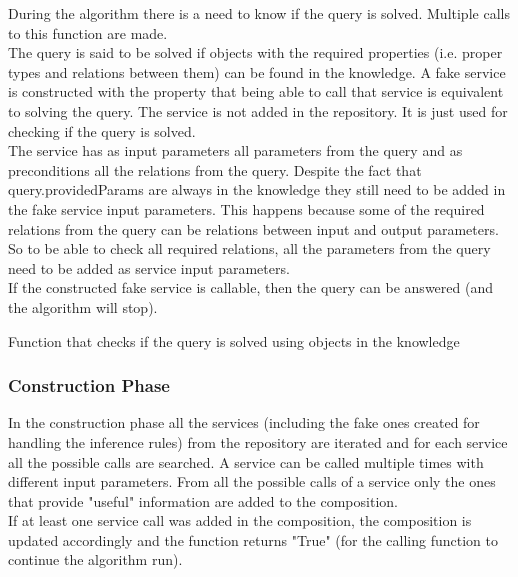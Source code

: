 \documentclass[12pt]{article}
\theoremstyle{definition}
\begin{document}
	During the algorithm there is a need to know if the query is solved. Multiple calls to this function are made. \\
	The query is said to be solved if objects with the required properties (i.e. proper types and relations between them) can be found in the knowledge. A fake service is constructed with the property that being able to call that service is equivalent to solving the query. The service is not added in the repository. It is just used for checking if the query is solved.\\
	The service has as input parameters all parameters from the query and as preconditions all the relations from the query. Despite the fact that query.providedParams are always in the knowledge they still need to be added in the fake service input parameters. This happens because some of the required relations from the query can be relations between input and output parameters. So to be able to check all required relations, all the parameters from the query need to be added as service input parameters.\\
	If the constructed fake service is callable, then the query can be answered (and the algorithm will stop). \\
	
	\begin{algorithm}[H]
		
		\caption{Function that checks if the query is solved using objects in the knowledge}
	\end{algorithm}
	\subsubsection{Construction Phase}
	In the construction phase all the services (including the fake ones created for handling the inference rules) from the repository are iterated and for each service all the possible calls are searched. A service can be called multiple times with different input parameters. From all the possible calls of a service only the ones that provide "useful" information are added to the composition.\\
	If at least one service call was added in the composition, the composition is updated accordingly and the function returns "True" (for the calling function to continue the algorithm run).
	
\end{document}
